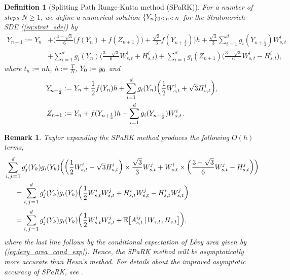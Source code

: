 \documentclass[sn-mathphys-num]{sn-jnl}%
\newtheorem{remark}{Remark}%
\newtheorem{definition}{Definition}%
\newcommand{\E}{\mathbb{E}}
\newcommand{\m}{\hspace{0.25mm}}
\newcommand{\mm}{\hspace{5mm}}
\begin{document}
\begin{definition}[Splitting Path Runge-Kutta method (SPaRK)] For a number of steps $N\geq 1$, we define a numerical solution $\{Y_n\}_{0\m\leq\m n\m\leq\m N}$ for the Stratonovich SDE (\ref{eq:strat_sde}) by\vspace{-2mm} 
\begin{align*}
Y_{n+1} := Y_n & + \bigg(\frac{3-\sqrt{3}}{6}\big(f(Y_n)+f(Z_{n+1})\big) + \frac{\sqrt{3}}{3} f(Y_{n+\frac{1}{2}})\bigg)h + \frac{\sqrt{3}}{3}\sum_{i=1}^d g_i(Y_{n+\frac{1}{2}}) W_{s,t}^i\\
& + \sum_{i=1}^d g_i(Y_n) \bigg(\frac{3-\sqrt{3}}{6} W_{s,t}^i + H_{s,t}^i\bigg) + \sum_{i=1}^d g_i(Z_{n+1})\bigg(\frac{3-\sqrt{3}}{6} W_{s,t}^i - H_{s,t}^i\bigg),
\end{align*}
where $t_n := nh$, $h := \frac{T}{N}$, $Y_0 := y_0\m$ and\vspace{-2mm}
\begin{align*}
Y_{n+\frac{1}{2}} & := Y_n + \frac{1}{2}f(Y_n)h + \sum_{i=1}^d g_i(Y_n) \bigg(\frac{1}{2}W_{s,t}^i + \sqrt{3} H_{s,t}^i\bigg),\\
Z_{n+1} & := Y_n + f(Y_{n+\frac{1}{2}}) h + \sum_{i=1}^d g_i(Y_{n+\frac{1}{2}}) W_{s,t}^i\m.
\end{align*}
\end{definition}

\begin{remark}\label{rmk:spark}
Taylor expanding the SPaRK method produces the following $O(h)$ terms,
\begin{align*}
&\sum_{i,\m j\m =\m 1}^d g_j^\prime(Y_k)g_i(Y_k)\bigg(\bigg(\frac{1}{2}W_{s,t}^i + \sqrt{3} H_{s,t}^i\bigg)\times\frac{\sqrt{3}}{3}W_{s,t}^j + W_{s,t}^i\times\bigg(\frac{3-\sqrt{3}}{6} W_{s,t}^j - H_{s,t}^j\bigg)\bigg)\\
&\mm = \sum_{i,\m j\m =\m 1}^d g_j^\prime(Y_k)g_i(Y_k)\bigg(\frac{1}{2}W_{s,t}^i W_{s,t}^j + H_{s,t}^i W_{s,t}^j - H_{s,t}^i W_{s,t}^j\bigg)\\[2pt]
&\mm = \sum_{i,\m j\m =\m 1}^d g_j^\prime(Y_k)g_i(Y_k)\bigg(\frac{1}{2}W_{s,t}^i W_{s,t}^j + \E\big[A_{s,t}^{ij}\,|\, W_{s,t}\m, H_{s,t}\big]\bigg),
\end{align*}
where the last line follows by the conditional expectation of L\'{e}vy area given by (\ref{eq:levy_area_cond_exp}). Hence, the SPaRK method will be asymptotically  more accurate than Heun's method. For details about the improved asymptotic accuracy of SPaRK, see \cite[Appendix A]{foster2024adaptive}.
\end{remark}\medbreak
\end{document}
